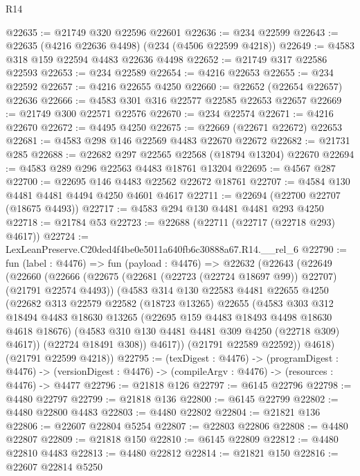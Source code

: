 \begin{lexlean}{R14}
\begin{coremodule}
@22635 := @21749 @320 @22596 @22601
@22636 := @234 @22599
@22643 := @22635 (@4216 @22636 @4498) (@234 (@4506 @22599 @4218))
@22649 := @4583 @318 @159 @22594 @4483 @22636 @4498
@22652 := @21749 @317 @22586 @22593
@22653 := @234 @22589
@22654 := @4216 @22653
@22655 := @234 @22592
@22657 := @4216 @22655 @4250
@22660 := @22652 (@22654 @22657) @22636
@22666 := @4583 @301 @316 @22577 @22585 @22653 @22657
@22669 := @21749 @300 @22571 @22576
@22670 := @234 @22574
@22671 := @4216 @22670
@22672 := @4495 @4250
@22675 := @22669 (@22671 @22672) @22653
@22681 := @4583 @298 @146 @22569 @4483 @22670 @22672
@22682 := @21731 @285
@22688 := @22682 @297 @22565 @22568 (@18794 @13204) @22670
@22694 := @4583 @289 @296 @22563 @4483 @18761 @13204
@22695 := @4567 @287
@22700 := @22695 @146 @4483 @22562 @22672 @18761
@22707 := @4584 @130 @4481 @4481 @4494 @4250 @4601 @4617
@22711 := @22694 (@22700 @22707 (@18675 @4493))
@22717 := @4583 @294 @130 @4481 @4481 @293 @4250
@22718 := @21784 @53
@22723 := @22688 (@22711 (@22717 (@22718 @293) @4617))
@22724 := LexLeanPreserve.C20ded4f4be0e5011a640fb6c30888a67.R14.__rel_6
@22790 := fun (label : @4476) =>
  fun (payload : @4476) =>
  @22632
    (@22643
      (@22649
        (@22660
          (@22666
            (@22675 (@22681 (@22723 (@22724 @18697 @99)) @22707) (@21791 @22574 @4493))
            (@4583
              @314
              @130
              @22583
              @4481
              @22655
              @4250
              (@22682
                @313
                @22579
                @22582
                (@18723 @13265)
                @22655
                (@4583
                  @303
                  @312
                  @18494
                  @4483
                  @18630
                  @13265
                  (@22695 @159 @4483 @18493 @4498 @18630 @4618 @18676)
                  (@4583 @310 @130 @4481 @4481 @309 @4250 (@22718 @309) @4617))
                (@22724 @18491 @308))
              @4617))
          (@21791 @22589 @22592))
        @4618)
      (@21791 @22599 @4218))
@22795 := (texDigest : @4476) ->
  (programDigest : @4476) ->
  (versionDigest : @4476) -> (compileArgv : @4476) -> (resources : @4476) -> @4477
@22796 := @21818 @126
@22797 := @6145 @22796
@22798 := @4480 @22797
@22799 := @21818 @136
@22800 := @6145 @22799
@22802 := @4480 @22800 @4483
@22803 := @4480 @22802
@22804 := @21821 @136
@22806 := @22607 @22804 @5254
@22807 := @22803 @22806
@22808 := @4480 @22807
@22809 := @21818 @150
@22810 := @6145 @22809
@22812 := @4480 @22810 @4483
@22813 := @4480 @22812
@22814 := @21821 @150
@22816 := @22607 @22814 @5250

\end{coremodule}
\end{lexlean}
